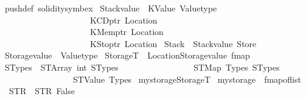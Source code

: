 \begin{isabellebody}
\isanewline
{}\isamarkupfalse%
\ push{\isacharunderscore}{\kern0pt}def\ {\isacharbrackleft}{\kern0pt}solidity{\isacharunderscore}{\kern0pt}symbex{\isacharbrackright}{\kern0pt}%
\isadelimdocument
%
\endisadelimdocument
%
\isatagdocument
%
\isamarkuptrue%
%
\endisatagdocument
{\isafolddocument}%
%
\isadelimdocument
%
\endisadelimdocument
{}\isamarkupfalse%
\ Stackvalue\ {\isacharequal}{\kern0pt}\ KValue\ Valuetype\isanewline
\ \ \ \ \ \ \ \ \ \ \ \ \ \ \ \ \ \ \ \ {\isacharbar}{\kern0pt}\ KCDptr\ Location\isanewline
\ \ \ \ \ \ \ \ \ \ \ \ \ \ \ \ \ \ \ \ {\isacharbar}{\kern0pt}\ KMemptr\ Location\isanewline
\ \ \ \ \ \ \ \ \ \ \ \ \ \ \ \ \ \ \ \ {\isacharbar}{\kern0pt}\ KStoptr\ Location\isanewline
\isanewline
{}\isamarkupfalse%
\ Stack\ {\isacharequal}{\kern0pt}\ {\isachardoublequoteopen}Stackvalue\ Store{\isachardoublequoteclose}%
\isadelimdocument
%
\endisadelimdocument
%
\isatagdocument
%
\isamarkuptrue%
%
\isamarkuptrue%
%
\endisatagdocument
{\isafolddocument}%
%
\isadelimdocument
%
\endisadelimdocument
{}\isamarkupfalse%
\ Storagevalue\ {\isacharequal}{\kern0pt}\ Valuetype\isanewline
\isanewline
{}\isamarkupfalse%
\ StorageT\ {\isacharequal}{\kern0pt}\ {\isachardoublequoteopen}{\isacharparenleft}{\kern0pt}Location{\isacharcomma}{\kern0pt}Storagevalue{\isacharparenright}{\kern0pt}\ fmap{\isachardoublequoteclose}\isanewline
\isanewline
{}\isamarkupfalse%
\ STypes\ {\isacharequal}{\kern0pt}\ STArray\ int\ STypes\isanewline
\ \ \ \ \ \ \ \ \ \ \ \ \ \ \ \ {\isacharbar}{\kern0pt}\ STMap\ Types\ STypes\isanewline
\ \ \ \ \ \ \ \ \ \ \ \ \ \ \ \ {\isacharbar}{\kern0pt}\ STValue\ Types%
\isadelimdocument
%
\endisadelimdocument
%
\isatagdocument
%
\isamarkuptrue%
%
\endisatagdocument
{\isafolddocument}%
%
\isadelimdocument
%
\endisadelimdocument
{}\isamarkupfalse%
\ mystorage{\isacharcolon}{\kern0pt}{\isacharcolon}{\kern0pt}StorageT\isanewline
{}\ {\isachardoublequoteopen}mystorage\ {\isasymequiv}\ {\isacharparenleft}{\kern0pt}fmap{\isacharunderscore}{\kern0pt}of{\isacharunderscore}{\kern0pt}list\isanewline
\ \ {\isacharbrackleft}{\kern0pt}{\isacharparenleft}{\kern0pt}STR\ {\isacharprime}{\kern0pt}{\isacharprime}{\kern0pt}{}{\isachardot}{\kern0pt}{}{\isachardot}{\kern0pt}{}{\isacharprime}{\kern0pt}{\isacharprime}{\kern0pt}{\isacharcomma}{\kern0pt}\ STR\ {\isacharprime}{\kern0pt}{\isacharprime}{\kern0pt}False{\isacharprime}{\kern0pt}{\isacharprime}{\kern0pt}{\isacharparenright}{\kern0pt}{\isacharcomma}{\kern0pt}\isanewline

\end{isabellebody}
